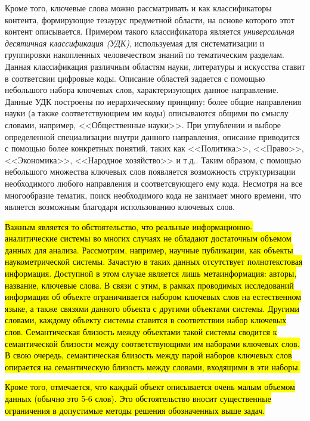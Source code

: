 Кроме того, ключевые слова можно рассматривать и как классификаторы контента, формирующие тезаурус предметной области, на основе которого этот контент описывается. Примером такого классификатора является \emph{универсальная десятичная классификация (УДК)}, используемая для систематизации и группировки накопленных человечеством знаний по тематическим разделам. Данная классификация различным областям науки, литературы и искусства ставит в соответсвии цифровые коды. Описание областей задается с помощью небольшого набора ключевых слов, характеризующих данное направление. Данные УДК построены по иерархическому принципу: более общие направления науки (а также соответствующием им коды) описываются общими по смыслу словами, например, <<Общественные науки>>. При углублении и выборе определенной специализации внутри данного направления, описание приводится с помощью более конкретных понятий, таких как <<Политика>>, <<Право>>, <<Экономика>>, <<Народное хозяйство>> и т.д.. Таким образом, с помощью небольшого множества ключевых слов появляется возможность структуризации необходимого любого направления и соответсвующего ему кода. Несмотря на все многообразие тематик, поиск необходимого кода не занимает много времени, что является возможным благодаря использованию ключевых слов.

\hl{Важным является то обстоятельство, что реальные информационно-аналитические системы во многих случаях не обладают достаточным объемом данных для анализа. Рассмотрим, например, научные публикации, как объекты наукометрической системы. Зачастую в таких данных отсутствует полнотекстовая информация. Доступной в этом случае является лишь метаинформация: авторы, название, ключевые слова. В связи с этим, в рамках проводимых исследований информация об объекте ограничивается набором ключевых слов на естественном языке, а также связями данного объекта с другими объектами системы. Другими словами, каждому объекту системы ставится в соответствии набор ключевых слов. Семантическая близость между объектами такой системы сводится к семантической близости между соответствующими им наборами ключевых слов. В свою очередь, семантическая близость между парой наборов ключевых слов опирается на семантическую близость между словами, входящими в эти наборы.} 

\hl{Кроме того, отмечается, что каждый объект описывается очень малым объемом данных (обычно это 5-6 слов). Это обстоятельство вносит существенные ограничения в допустимые методы решения обозначенных выше задач.}




